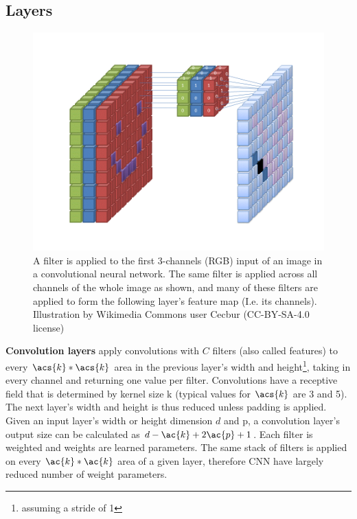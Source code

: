 \subsection{Layers}

\begin{figure}
  \begin{center}
    \includegraphics{gfx/Convolutional_Neural_Network_with_Color_Image_Filter.png}
    \caption[Standard convolution]{A filter is applied to the first 3-channels (RGB) input of an image in a convolutional neural network. The same filter is applied across all channels of the whole image as shown, and many of these filters are applied to form the following layer's feature map (I.e. its channels). Illustration by Wikimedia Commons user Cecbur (CC-BY-SA-4.0 license)}
    \label{fig:convolutionfilter}
  \end{center}
\end{figure}

\textbf{Convolution layers} apply convolutions with $C$ filters (also called features) to every $\acs{k}*\acs{k}$ area in the previous layer's width and height\footnote{assuming a stride of 1}, taking in every channel and returning one value per filter. Convolutions have a receptive field that is determined by kernel size \acs{k} (typical values for $\acs{k}$ are 3 and 5). The next layer's width and height is thus reduced unless padding is applied. Given an input layer's width or height dimension $d$ and \ac{p}, a convolution layer's output size can be calculated as $d-\ac{k}+2\ac{p}+1$. Each filter is weighted and weights are learned parameters. The same stack of filters is applied on every $\ac{k}*\ac{k}$ area of a given layer, therefore \acs{CNN} have largely reduced number of weight parameters.

